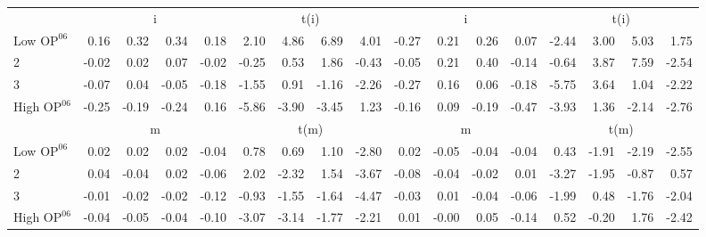 \begin{table}[!ht]
\begin{tabular}{lrrrrrrrrrrrrrrrr}
  
     & \multicolumn{4}{c}{i} & \multicolumn{4}{c}{t(i)}  & \multicolumn{4}{c}{i} & \multicolumn{4}{c}{t(i)}   \\
     \cmidrule(r){2-5} \cmidrule(r){6-9}  \cmidrule(r){10-13} \cmidrule(r){14-17} 
    Low $\text{OP}^{06}$  & 0.16  & 0.32  & 0.34  & 0.18  & 2.10  & 4.86  & 6.89  & 4.01  & -0.27  & 0.21  & 0.26  & 0.07  & -2.44  & 3.00  & 5.03  & 1.75   \\
    2  & -0.02  & 0.02  & 0.07  & -0.02  & -0.25  & 0.53  & 1.86  & -0.43  & -0.05  & 0.21  & 0.40  & -0.14  & -0.64  & 3.87  & 7.59  & -2.54   \\
    3  & -0.07  & 0.04  & -0.05  & -0.18  & -1.55  & 0.91  & -1.16  & -2.26  & -0.27  & 0.16  & 0.06  & -0.18  & -5.75  & 3.64  & 1.04  & -2.22   \\
    High $\text{OP}^{06}$  & -0.25  & -0.19  & -0.24  & 0.16  & -5.86  & -3.90  & -3.45  & 1.23  & -0.16  & 0.09  & -0.19  & -0.47  & -3.93  & 1.36  & -2.14  & -2.76   \\
    
  
     & \multicolumn{4}{c}{m} & \multicolumn{4}{c}{t(m)}  & \multicolumn{4}{c}{m} & \multicolumn{4}{c}{t(m)}   \\
     \cmidrule(r){2-5} \cmidrule(r){6-9}  \cmidrule(r){10-13} \cmidrule(r){14-17} 
    Low $\text{OP}^{06}$  & 0.02  & 0.02  & 0.02  & -0.04  & 0.78  & 0.69  & 1.10  & -2.80  & 0.02  & -0.05  & -0.04  & -0.04  & 0.43  & -1.91  & -2.19  & -2.55   \\
    2  & 0.04  & -0.04  & 0.02  & -0.06  & 2.02  & -2.32  & 1.54  & -3.67  & -0.08  & -0.04  & -0.02  & 0.01  & -3.27  & -1.95  & -0.87  & 0.57   \\
    3  & -0.01  & -0.02  & -0.02  & -0.12  & -0.93  & -1.55  & -1.64  & -4.47  & -0.03  & 0.01  & -0.04  & -0.06  & -1.99  & 0.48  & -1.76  & -2.04   \\
    High $\text{OP}^{06}$  & -0.04  & -0.05  & -0.04  & -0.10  & -3.07  & -3.14  & -1.77  & -2.21  & 0.01  & -0.00  & 0.05  & -0.14  & 0.52  & -0.20  & 1.76  & -2.42   \\
    
  
  \bottomrule
\end{tabular}
\label{tbl:32_Size_BM_OP_F17}
\end{table}